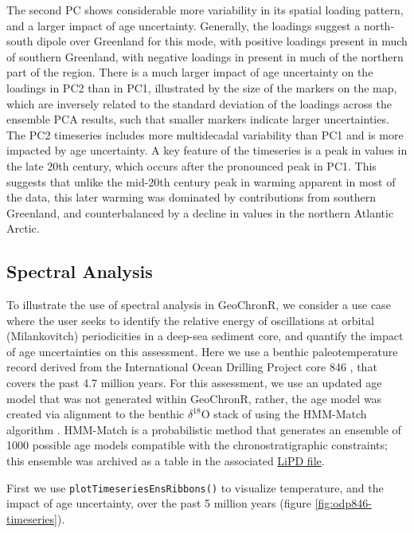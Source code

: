 \documentclass[gchron, manuscript]{copernicus}
\begin{document}
The second PC shows considerable more variability in its spatial loading pattern, and a larger impact of age uncertainty.
Generally, the loadings suggest a north-south dipole over Greenland for this mode, with positive loadings present in much of southern Greenland, with negative loadings in present in much of the northern part of the region.
There is a much larger impact of age uncertainty on the loadings in PC2 than in PC1, illustrated by the size of the markers on the map, which are inversely related to the standard deviation of the loadings across the ensemble PCA results, such that smaller markers indicate larger uncertainties.
The PC2 timeseries includes more multidecadal variability than PC1 and is more impacted by age uncertainty.
A key feature of the timeseries is a peak in values in the late 20th century, which occurs after the pronounced peak in PC1.
This suggests that unlike the mid-20th century peak in warming apparent in most of the data, this later warming was dominated by contributions from southern Greenland, and counterbalanced by a decline in values in the northern Atlantic Arctic.

\hypertarget{sec:spec_vignette}{%
\subsection{Spectral Analysis}\label{sec:spec_vignette}}

To illustrate the use of spectral analysis in GeoChronR, we consider a use case where the user seeks to identify the relative energy of oscillations at orbital (Milankovitch) periodicities in a deep-sea sediment core, and quantify the impact of age uncertainties on this assessment.
Here we use a benthic paleotemperature record derived from the International Ocean Drilling Project core 846 \citep{mix1995benthic, Shackleton95}, that covers the past 4.7 million years.
For this assessment, we use an updated age model that was not generated within GeoChronR, rather, the age model was created via alignment to the benthic \(\delta^{18}\mathrm{O}\) stack of \citet{LisieckiRaymo05} using the HMM-Match algorithm \citep{ProbStack, Khider_2017}.
HMM-Match is a probabilistic method that generates an ensemble of 1000 possible age models compatible with the chronostratigraphic constraints; this ensemble was archived as a table in the associated \href{http://lipdverse.org/geoChronR-examples/ODP846.Lawrence.2006.lpd}{LiPD file}.

First we use \texttt{plotTimeseriesEnsRibbons()} to visualize temperature, and the impact of age uncertainty, over the past 5 million years (figure \ref{fig:odp846-timeseries}).
\end{document}
